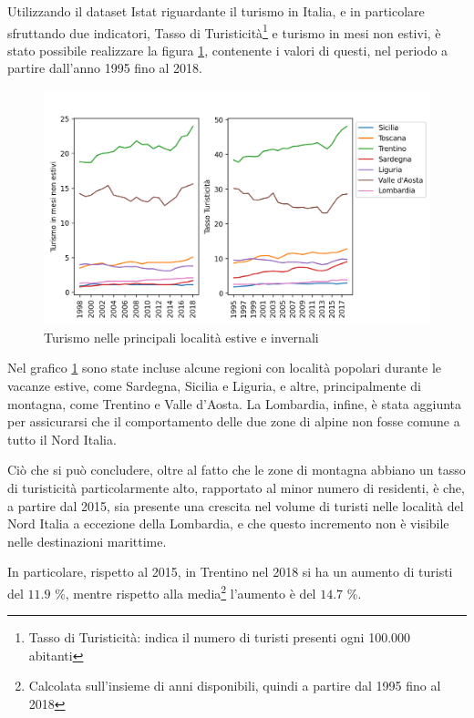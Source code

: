 \documentclass[a4paper]{report}
\begin{document}
Utilizzando il dataset Istat riguardante il turismo in Italia, e in 
particolare sfruttando due indicatori, Tasso di 
Turisticità\footnote{Tasso di Turisticità: indica il numero di turisti 
presenti ogni 100.000 abitanti\cite{ONTIT:1}} 
e turismo in mesi non estivi, è stato possibile realizzare 
la figura \ref{fig:turismo}, 
contenente i valori di questi, nel periodo a partire dall'anno 1995 fino al 2018. 

\begin{figure}
    \includegraphics[width=\linewidth]{../src/turismo/turismo.png}
    \caption{Turismo nelle principali località estive e invernali}
    \label{fig:turismo}
\end{figure}

Nel grafico \ref{fig:turismo} sono state incluse alcune regioni con località popolari 
durante le vacanze estive, come Sardegna, Sicilia e Liguria, e altre, principalmente 
di montagna, come Trentino e Valle d'Aosta. 
La Lombardia, infine, è stata aggiunta per assicurarsi che il comportamento delle due zone 
di alpine non fosse comune a tutto il Nord Italia. 

Ciò che si può concludere, oltre al fatto che le zone di montagna abbiano 
un tasso di turisticità particolarmente alto, rapportato al minor numero di residenti,
è che, a partire dal 2015, sia presente una crescita nel volume di turisti nelle località 
del Nord Italia a eccezione della Lombardia, e che questo incremento non è visibile nelle 
destinazioni marittime. 

In particolare, rispetto al 2015, in Trentino nel 2018 si ha un aumento 
di turisti del $11.9$ \%, mentre rispetto alla 
media\footnote{Calcolata sull'insieme di anni disponibili, quindi 
a partire dal 1995 fino al 2018} l'aumento è del $14.7$ \%. 
\end{document}
